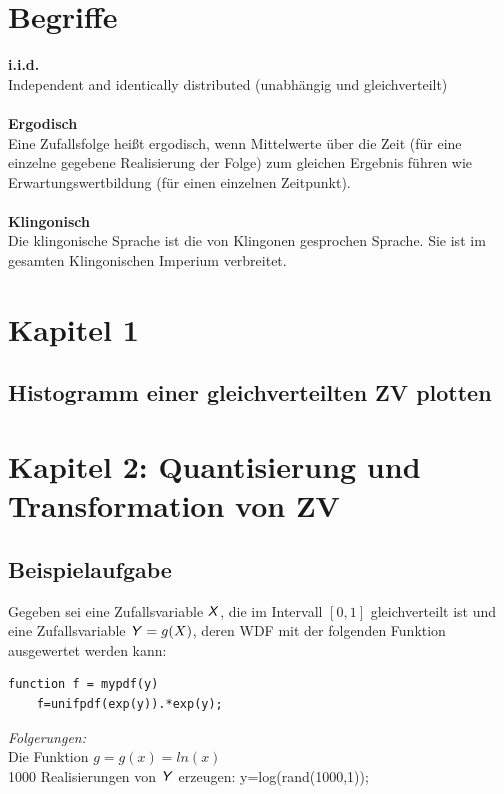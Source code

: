 \documentclass[deutsch]{latex4ei/latex4ei_sheet}
\begin{document}
\section{Begriffe}
\begin{sectionbox}
	\textbf{i.i.d.}\\
	Independent and identically distributed (unabhängig und gleichverteilt)\\\\
	\textbf{Ergodisch}\\
	Eine Zufallsfolge heißt ergodisch, wenn Mittelwerte über die Zeit (für
	eine einzelne gegebene Realisierung der Folge) zum gleichen Ergebnis führen wie
	Erwartungswertbildung (für einen einzelnen Zeitpunkt).\\\\
	\textbf{Klingonisch}\\
	Die klingonische Sprache ist die von Klingonen gesprochen Sprache. Sie ist im gesamten Klingonischen Imperium verbreitet.
	
\end{sectionbox}


\section{Kapitel 1}
\begin{sectionbox}
	\subsection{Histogramm einer gleichverteilten ZV plotten}
	
\end{sectionbox}

\section{Kapitel 2: Quantisierung und Transformation von ZV}
\begin{sectionbox}
	\subsection{Beispielaufgabe}
	Gegeben sei eine Zufallsvariable $\operatorname{\textsf{\textit{X}}}$, die im Intervall $[0, 1]$ gleichverteilt ist und eine Zufallsvariable $\operatorname{\textsf{\textit{Y}}}=g(X)$, deren WDF mit der folgenden Funktion ausgewertet werden kann:
	\begin{lstlisting}[gobble=4]
	function f = mypdf(y)
	f=unifpdf(exp(y)).*exp(y);	
	\end{lstlisting}
	\emph{Folgerungen:}\\
	Die Funktion $g=g(x)=ln(x)$\\
	1000 Realisierungen von $\operatorname{\textsf{\textit{Y}}}$ erzeugen: y=log(rand(1000,1));\\
\end{sectionbox}
\end{document}
